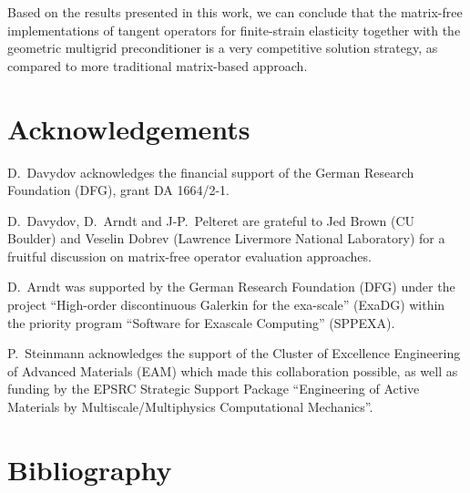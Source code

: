\documentclass[times,doublespace]{nmeauth}
\begin{document}
{\color{red}
Based on the results presented in this work, we can conclude that the matrix-free implementations of tangent operators for finite-strain elasticity together with
the geometric multigrid preconditioner is a very competitive solution strategy, as compared to more traditional matrix-based approach.}

\ifijnme
\acks
\else
\section*{Acknowledgements}
\fi

D.~Davydov acknowledges the financial support of the German Research Foundation (DFG), grant DA 1664/2-1.

D.~Davydov, D.~Arndt and J-P.~Pelteret are grateful to Jed Brown (CU Boulder) and Veselin Dobrev (Lawrence Livermore National Laboratory) for a fruitful discussion on matrix-free operator evaluation approaches.

D.~Arndt was supported by the German Research Foundation (DFG) under the project ``High-order discontinuous
Galerkin for the exa-scale'' (\mbox{ExaDG}) within the priority program ``Software
for Exascale Computing'' (SPPEXA).


P.~Steinmann acknowledges the support of the Cluster of Excellence Engineering of Advanced Materials (EAM) which made this collaboration possible, as well as funding by the EPSRC Strategic Support Package ``Engineering of Active Materials by Multiscale/Multiphysics Computational Mechanics''.

\ifijnme

\else
\section*{Bibliography}

\fi


\end{document}
